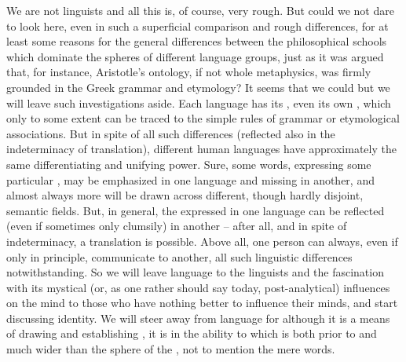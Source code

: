 \pa 
We are not linguists and all this is, of course, very rough. But could we not dare
to look here, even in such a superficial comparison and rough differences, for
at least some reasons for the
general differences between the philosophical schools which dominate the spheres
of different language groups, just as it was argued that, for instance,
Aristotle's ontology, 
if not whole metaphysics, was firmly grounded in the Greek grammar and etymology?
It seems that we could but we will leave such investigations aside. 
Each language has its , even its own , which only to some
extent can be traced to the simple rules of grammar or etymological
associations.  But in spite of all such differences (reflected also in the
indeterminacy of translation), different human languages have approximately the
same differentiating and unifying power.  Sure, some words, expressing some
particular , may be emphasized in one language and missing in
another, and almost always more  will be drawn across
different, though hardly disjoint, semantic fields.  But, in general, the
 expressed in one language can be reflected (even if sometimes
only clumsily) in another -- after all, and in spite of indeterminacy, a
translation is possible. Above all, one person can always, even if only in
principle, communicate to another, all such linguistic differences
notwithstanding. So we will leave language to the
linguists and the fascination with its mystical (or, as one rather should say
today, post-analytical) influences on the mind to those who have nothing better
to influence their minds, and start discussing identity.  We will steer away
from language for although it is a means of drawing and establishing
, it is  in the ability to  which
is both prior to and much wider than the sphere of the , not to
mention the mere words.


